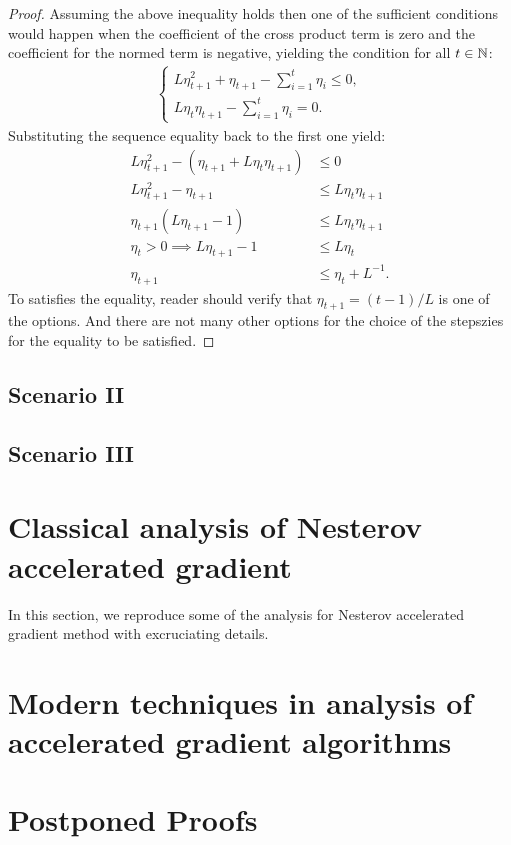 \documentclass[12pt]{article}
\begin{document}
\begin{proof}
            Assuming the above inequality holds then one of the sufficient conditions would happen when the coefficient of the cross product term is zero and the coefficient for the normed term is negative, yielding the condition for all $t \in \mathbb N$: 
            \begin{align*}
                \begin{cases}
                    L\eta_{t + 1}^2 + \eta_{t + 1} - \sum_{i = 1}^{t}\eta_i 
                    \le 0, 
                    \\
                    L\eta_t \eta_{t + 1} - \sum_{i = 1}^{t} \eta_i 
                    = 0. 
                \end{cases}
            \end{align*}
            Substituting the sequence equality back to the first one yield: 
            \begin{align*}
                L\eta_{t + 1}^2 - (\eta_{t + 1} + L\eta_t\eta_{t + 1}) &\le 0 
                \\
                L\eta^2_{t + 1} - \eta_{t + 1}
                &\le 
                L\eta_t \eta_{t + 1} 
                \\
                \eta_{t + 1}(L\eta_{t + 1} - 1) 
                &\le L\eta_t\eta_{t + 1}
                \\
                \eta_t > 0 
                \implies 
                L\eta_{t + 1} - 1 &\le 
                L\eta_t 
                \\
                \eta_{t + 1} &\le \eta_t + L^{-1}. 
            \end{align*}
            To satisfies the equality, reader should verify that $\eta_{t + 1} = (t - 1)/ L$ is one of the options. 
            And there are not many other options for the choice of the stepszies for the equality to be satisfied. 
        \end{proof}


    \subsection{Scenario II}
        
    \subsection{Scenario III}
    


\section{Classical analysis of Nesterov accelerated gradient}
    In this section, we reproduce some of the analysis for Nesterov accelerated gradient method with excruciating details. 

\section{Modern techniques in analysis of accelerated gradient algorithms}


\printbibliography

\appendix
\section*{Postponed Proofs}
\end{document}
